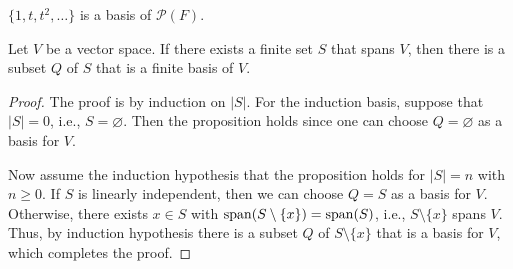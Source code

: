 \begin{example}
  $\{1, t, t^2, \dots\}$ is a basis of $\mathcal{P}(F)$.
\end{example}

\begin{proposition}\label{prop:finite-basis-existence}
  Let $V$ be a vector space.
  If there exists a finite set $S$ that spans $V$, then there is a subset
  $Q$ of $S$ that is a finite basis of $V$.
\end{proposition}
\begin{proof}
  The proof is by induction on $|S|$.
  For the induction basis, suppose that $|S| = 0$, i.e., $S = \varnothing$.
  Then the proposition holds since one can choose $Q = \varnothing$ as a basis
  for $V$.

  Now assume the induction hypothesis that the proposition holds for $|S| = n$
  with $n \geq 0$.
  If $S$ is linearly independent, then we can choose $Q = S$ as a basis for
  $V$.
  Otherwise, there exists $x \in S$ with $\operatorname{span}(S \setminus \{x\}) = \operatorname{span}(S)$,
  i.e., $S \setminus \{x\}$ spans $V$.
  Thus, by induction hypothesis there is a subset $Q$ of $S \setminus \{x\}$
  that is a basis for $V$, which completes the proof.
\end{proof}

